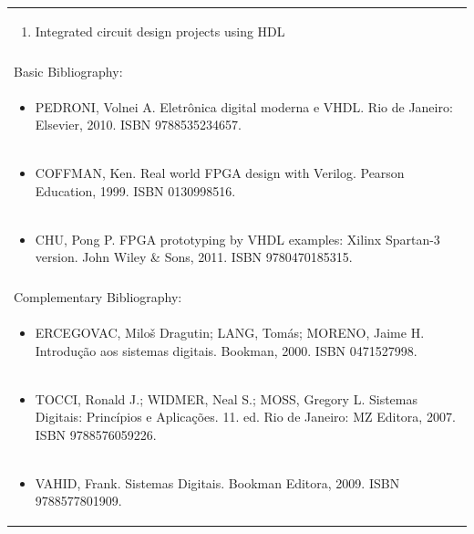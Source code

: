 \documentclass[11pt]{article}
\begin{document}
\begin{center}
\begin{longtable}{|p{4cm}|p{4cm}|p{4cm}|p{4cm}|}
\multicolumn{4}{|p{\dimexpr 16cm + 6\tabcolsep\relax}|}{\begin{enumerate}[start=7]\item Integrated circuit design projects using HDL\end{enumerate}}\\
\multicolumn{4}{|p{\dimexpr 16cm + 6\tabcolsep\relax}|}{}\\
\hline
\multicolumn{4}{|p{16cm}|}{Basic Bibliography:}\\*
\multicolumn{4}{|p{\dimexpr 16cm + 6\tabcolsep\relax}|}{\begin{itemize}\item PEDRONI, Volnei A. Eletrônica digital moderna e VHDL. Rio de Janeiro: Elsevier, 2010. ISBN 9788535234657.\end{itemize}}\\
\multicolumn{4}{|p{\dimexpr 16cm + 6\tabcolsep\relax}|}{\begin{itemize}\item COFFMAN, Ken. Real world FPGA design with Verilog. Pearson Education, 1999. ISBN 0130998516.\end{itemize}}\\
\multicolumn{4}{|p{\dimexpr 16cm + 6\tabcolsep\relax}|}{\begin{itemize}\item CHU, Pong P. FPGA prototyping by VHDL examples: Xilinx Spartan-3 version. John Wiley \& Sons, 2011. ISBN 9780470185315.\end{itemize}}\\
\multicolumn{4}{|p{16cm}|}{}\\
\hline
\multicolumn{4}{|p{16cm}|}{Complementary Bibliography:}\\*
\multicolumn{4}{|p{\dimexpr 16cm + 6\tabcolsep\relax}|}{\begin{itemize}\item ERCEGOVAC, Miloš Dragutin; LANG, Tomás; MORENO, Jaime H. Introdução aos sistemas digitais. Bookman, 2000. ISBN 0471527998.\end{itemize}}\\
\multicolumn{4}{|p{\dimexpr 16cm + 6\tabcolsep\relax}|}{\begin{itemize}\item TOCCI, Ronald J.; WIDMER, Neal S.; MOSS, Gregory L. Sistemas Digitais: Princípios e Aplicações. 11. ed. Rio de Janeiro: MZ Editora, 2007. ISBN 9788576059226.\end{itemize}}\\
\multicolumn{4}{|p{\dimexpr 16cm + 6\tabcolsep\relax}|}{\begin{itemize}\item VAHID, Frank. Sistemas Digitais. Bookman Editora, 2009. ISBN 9788577801909.\end{itemize}}\\

\end{longtable}
\end{center}
\end{document}
